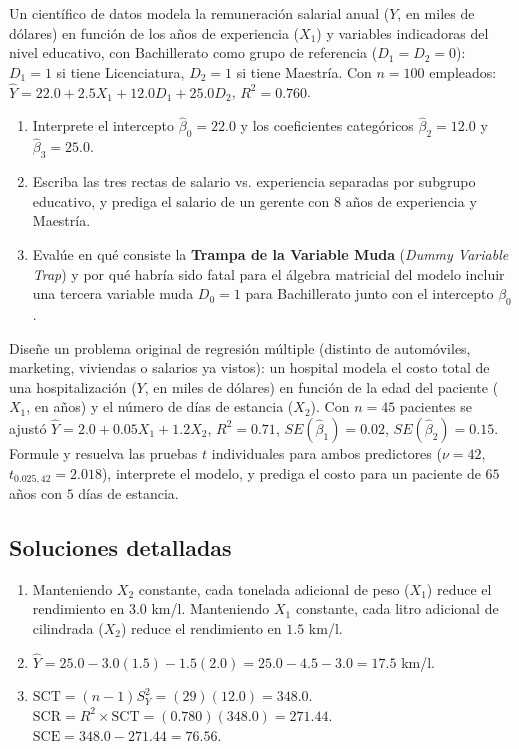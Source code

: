 \begin{problema}
	\label{prob:ee59291}
	Un científico de datos modela la remuneración salarial anual ($Y$, en miles de dólares) en función de los años de experiencia ($X_1$) y variables indicadoras del nivel educativo, con Bachillerato como grupo de referencia ($D_1=D_2=0$): $D_1=1$ si tiene Licenciatura, $D_2=1$ si tiene Maestría. Con $n=100$ empleados: $\hat{Y} = 22.0 + 2.5X_1 + 12.0D_1 + 25.0D_2$, $R^2=0.760$.
	\begin{enumerate}
		\item Interprete el intercepto $\hat{\beta}_0=22.0$ y los coeficientes categóricos $\hat{\beta}_2=12.0$ y $\hat{\beta}_3=25.0$.
		\item Escriba las tres rectas de salario vs. experiencia separadas por subgrupo educativo, y prediga el salario de un gerente con 8 años de experiencia y Maestría.
		\item Evalúe en qué consiste la \textbf{Trampa de la Variable Muda} (\emph{Dummy Variable Trap}) y por qué habría sido fatal para el álgebra matricial del modelo incluir una tercera variable muda $D_0=1$ para Bachillerato junto con el intercepto $\beta_0$.
	\end{enumerate}
\end{problema}

\begin{problema}
	\label{prob:a6a21c3}
	Diseñe un problema original de regresión múltiple (distinto de automóviles, marketing, viviendas o salarios ya vistos): un hospital modela el costo total de una hospitalización ($Y$, en miles de dólares) en función de la edad del paciente ($X_1$, en años) y el número de días de estancia ($X_2$). Con $n=45$ pacientes se ajustó $\hat{Y} = 2.0 + 0.05X_1 + 1.2X_2$, $R^2=0.71$, $SE(\hat{\beta}_1)=0.02$, $SE(\hat{\beta}_2)=0.15$. Formule y resuelva las pruebas $t$ individuales para ambos predictores ($\nu=42$, $t_{0.025,42}=2.018$), interprete el modelo, y prediga el costo para un paciente de $65$ años con $5$ días de estancia.
\end{problema}

\subsection*{Soluciones detalladas}

\begin{solproblema}[prob:0d6ff67]
	\begin{enumerate}
		\item Manteniendo $X_2$ constante, cada tonelada adicional de peso ($X_1$) reduce el rendimiento en $3.0$ km/l. Manteniendo $X_1$ constante, cada litro adicional de cilindrada ($X_2$) reduce el rendimiento en $1.5$ km/l.
		\item $\hat{Y} = 25.0-3.0(1.5)-1.5(2.0) = 25.0-4.5-3.0 = 17.5$ km/l.
		\item $\text{SCT}=(n-1)S_Y^2=(29)(12.0)=348.0$. $\text{SCR}=R^2\times\text{SCT}=(0.780)(348.0)=271.44$. $\text{SCE}=348.0-271.44=76.56$.
	\end{enumerate}
\end{solproblema}

